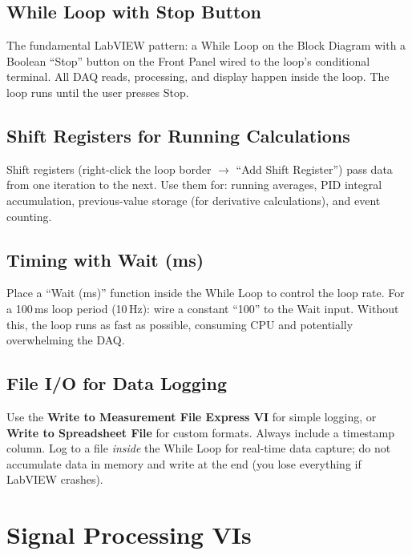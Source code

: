 \documentclass[11pt,letterpaper,twoside,openany]{book}
\begin{document}
\subsection*{While Loop with Stop Button}
The fundamental LabVIEW pattern: a While Loop on the Block Diagram with a Boolean ``Stop'' button on the Front Panel wired to the loop's conditional terminal. All DAQ reads, processing, and display happen inside the loop. The loop runs until the user presses Stop.

\subsection*{Shift Registers for Running Calculations}
Shift registers (right-click the loop border $\to$ ``Add Shift Register'') pass data from one iteration to the next. Use them for: running averages, PID integral accumulation, previous-value storage (for derivative calculations), and event counting.

\subsection*{Timing with Wait (ms)}
Place a ``Wait (ms)'' function inside the While Loop to control the loop rate. For a 100\,ms loop period (10\,Hz): wire a constant ``100'' to the Wait input. Without this, the loop runs as fast as possible, consuming CPU and potentially overwhelming the DAQ.

\subsection*{File I/O for Data Logging}
Use the \textbf{Write to Measurement File Express VI} for simple logging, or \textbf{Write to Spreadsheet File} for custom formats. Always include a timestamp column. Log to a file \emph{inside} the While Loop for real-time data capture; do not accumulate data in memory and write at the end (you lose everything if LabVIEW crashes).

\section*{Signal Processing VIs}
\end{document}
